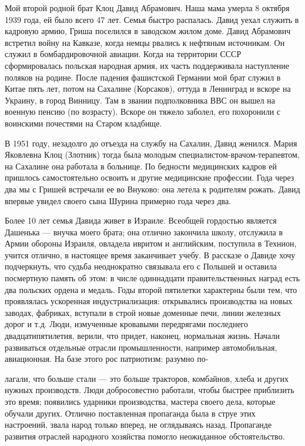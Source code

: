 \label{171-1}
Мой второй родной брат Клоц Давид Абрамович. Наша мама умерла 8 октября 1939 года, ей было всего 47 лет. Семья быстро распалась. Давид уехал служить в кадровую армию, Гриша поселился в заводском жилом доме. Давид Абрамович встретил войну на Кавказе, когда немцы рвались к нефтяным источникам. Он служил в бомбардировочной авиации. Когда на территории СССР сформировалась польская народная армия, их часть поддерживала наступление поляков на родине. После падения фашистской Германии мой брат служил в Китае пять лет, потом на Сахалине (Корсаков), оттуда в Ленинград и вскоре на Украину, в город Винницу. Там в звании подполковника ВВС он вышел на военную пенсию (по возрасту). Вскоре он тяжело заболел, его похоронили с воинскими почестями на Старом кладбище.

В 1951 году, незадолго до отъезда на службу на Сахалин, Давид женился. Мария Яковлевна Клоц (Злотник) тогда была молодым специалистом-врачом-терапевтом, на Сахалине она работала в больнице. По бедности медицинских кадров ей пришлось самостоятельно освоить и другие медицинские профессии. Года через два мы с Гришей встречали ее во Внуково: она летела к родителям рожать. Давид впервые увидел своего сына Шурина примерно года через два.

\label{172-1}
Более 10 лет семья Давида живет в Израиле. Всеобщей гордостью является Дашенька — внучка моего брата; она отлично закончила школу, отслужила в Армии обороны Израиля, овладела ивритом и английским, поступила в Технион, учится отлично, в настоящее время заканчивает учебу. В рассказе о Давиде хочу подчеркнуть, что судьба неоднократно связывала его с Польшей и оставила посмертную память об этом: в числе одиннадцати правительственных наград есть два польских ордена и медаль. Годы второй пятилетки характерны были тем, что проявлялась ускоренная индустриализация: открывались производства на новых заводах, фабриках, вступали в строй новые доменные печи, линии железных дорог и т.д. Люди, измученные кровавыми передрягами последнего двадцатипятилетия, верили, что придет, наконец, нормальная жизнь. Начали развиваться отдельные отрасли промышленности, например автомобильная, авиационная. На базе этого рос патриотизм: разумно по-

\label{173-1}
лагали, что больше стали — это больше тракторов, комбайнов, хлеба и других нужных производств. Люди добросовестно работали, чтобы быстрее приблизить это время; появились ударники производства, мастера своего дела, которые обучали других. Отлично поставленная пропаганда была в струе этих настроений, звала народ только вперед, не оглядываясь назад. Пропаганде развития отраслей народного хозяйства помогло неожиданное обстоятельство.

